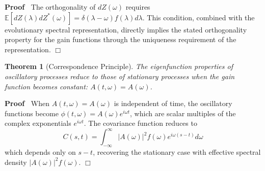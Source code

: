\documentclass{article}
\newenvironment{proof}{\noindent\textbf{Proof\ }}{\hspace*{\fill}$\Box$\medskip}
\newtheorem{theorem}{Theorem}
\begin{document}
\begin{proof}
  The orthogonality of $dZ (\omega)$ requires $\mathbb{E} [dZ (\lambda)
  dZ^{\ast} (\omega)] = \delta (\lambda - \omega) f (\lambda) d \lambda$. This
  condition, combined with the evolutionary spectral representation, directly
  implies the stated orthogonality property for the gain functions through the uniqueness requirement of the representation.
\end{proof}

\begin{theorem}
  [Correspondence Principle] The eigenfunction properties of oscillatory
  processes reduce to those of stationary processes when the gain function
  becomes constant: $A (t, \omega) = A (\omega)$.
\end{theorem}

\begin{proof}
  When $A (t, \omega) = A (\omega)$ is independent of time, the oscillatory
  functions become $\phi (t, \omega) = A (\omega) e^{i \omega t}$, which are
  scalar multiples of the complex exponentials $e^{i \omega t}$. The
  covariance function reduces to
  \begin{equation}
    C (s, t) = \int_{- \infty}^{\infty} |A (\omega) |^2 f (\omega) e^{i \omega
    (s - t)} d \omega
  \end{equation}
  which depends only on $s - t$, recovering the stationary case with effective
  spectral density $|A (\omega) |^2 f (\omega)$.
\end{proof}
\end{document}
